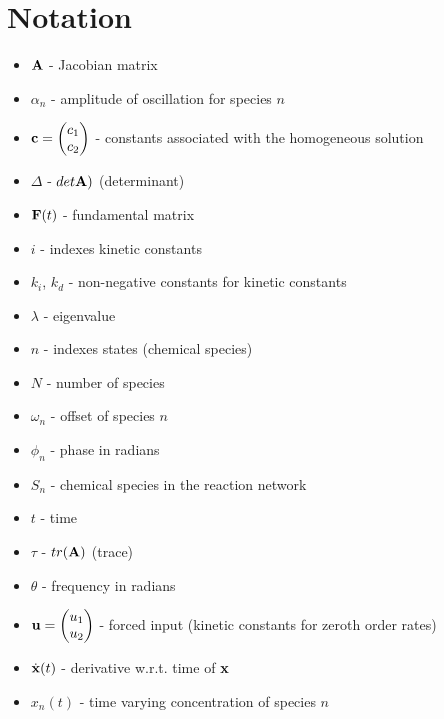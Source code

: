 \documentclass{bmcart}
\begin{document}
\section*{Notation}
\begin{itemize}
\item ${\bf A}$ - Jacobian matrix
\item $\alpha_n$ - amplitude of oscillation for species $n$
\item ${\bf c} = \begin{pmatrix} c_1 \\ c_2 \end{pmatrix}$ - constants associated with the homogeneous solution
\item $\Delta$ -
$det {\bf A})$ (determinant)
\item  ${\bf F} (t)$ - fundamental matrix
\item $i$ - indexes kinetic constants
\item $k_i$, $k_d$ -
non-negative constants for kinetic constants
\item $\lambda$ -
eigenvalue
\item $n$ - indexes states (chemical species)
\item $N$ - number of species
\item $\omega_n$ - offset of species $n$ 
\item $\phi_n$ - phase in radians
\item $S_n$ - chemical species in the reaction network
\item $t$ - time 
\item $\tau$ - $tr({\bf A})$ (trace)
\item $\theta$ - frequency in
radians 
\item ${\bf u} = \begin{pmatrix} u_1 \\ u_2 \end{pmatrix}$ - forced input (kinetic constants for zeroth order
rates)
\item $\dot{\bf x} (t)$ - derivative w.r.t. time of ${\bf x}$
\item $x_n(t)$
 - time varying concentration of species $n$
\end{itemize}
\end{document}
